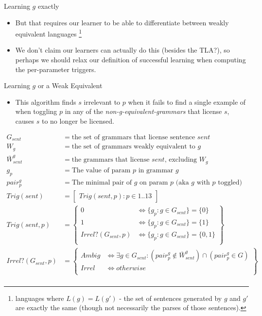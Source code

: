 \documentclass[presentation]{beamer}
\begin{document}
\begin{frame}[label={sec:org6662404}]{Learning \(g\) exactly}
\begin{itemize}
\item But that requires our learner to be able to differentiate between weakly
equivalent languages \footnote{languages where \(L(g) = L(g')\) - the set of
sentences generated by \(g\) and \(g'\) are exactly the same (though not
necessarily the parses of those sentences).}
\item We don't claim our learners can actually do this (besides the TLA?), so
perhaps we should relax our definition of successful learning when computing
the per-parameter triggers.
\end{itemize}
\end{frame}
\begin{frame}[shrink=12,label={sec:org09bd30d}]{Learning \(g\) or a Weak Equivalent}
\begin{itemize}
\item This algorithm finds \(s\) irrelevant to \(p\) when it fails to find a single
example of when toggling \(p\) in any of the \emph{non-g-equivalent-grammars} that
license \(s\), causes \(s\) to no longer be licensed.
\end{itemize}
\begin{align*}
G_{sent} &= \text{the set of grammars that license sentence $sent$} \\
W_g &= \text{the set of grammars weakly equivalent to $g$} \\
\bar{W}_{sent}^g &= \text{the grammars that license $sent$, excluding $W_g$} \\
g_p &= \text{The value of param $p$ in grammar $g$} \\
pair_p^g &= \text{The minimal pair of $g$ on param $p$ (aka $g$ with $p$ toggled)} \\
  Trig(sent) &= \begin{bmatrix} Trig(sent, p) : p \in 1..13 \end{bmatrix} \\
  Trig(sent, p) &= \left\{\begin{array}{lr}
      0                        & \iff \{g_p : g \in G_{sent} \} = \{0\} \\
      1                        & \iff \{g_p : g \in G_{sent} \} = \{1\}\\
      Irrel?(G_{sent}, p) & \iff \{g_p : g \in G_{sent} \} = \{0, 1\} \\
      \end{array}\right\} \\
Irrel?(G_{sent}, p) &= \left\{\begin{array}{lr}
      Ambig                        & \iff \exists g \in G_{sent} :
                                     (pair_p^g \notin \bar{W}_{sent}^g) \cap (pair_p^g \in G) \\
      Irrel                        & \iff  otherwise \\
      \end{array}\right\} \\
\end{align*}
\end{frame}
\end{document}
